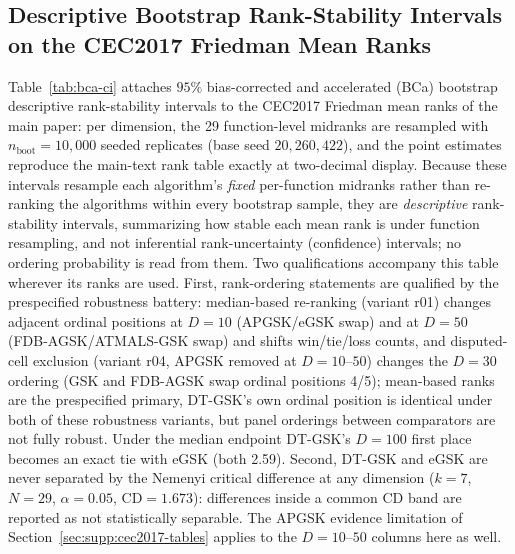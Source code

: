 \documentclass[algorithms,article,submit,moreauthors,pdftex]{Definitions/mdpi}
\newcommand{\dtgsk}{DT-GSK}
\newcommand{\atmals}{ATMALS-GSK}
\newcommand{\apgsk}{APGSK}
\newcommand{\fdbagsk}{FDB-AGSK}
\newcommand{\egsk}{eGSK}
\begin{document}
\subsection{Descriptive Bootstrap Rank-Stability Intervals on the CEC2017 Friedman Mean Ranks}\label{sec:supp:bca}

Table~\ref{tab:bca-ci} attaches $95\%$ bias-corrected and accelerated
(BCa) bootstrap descriptive rank-stability intervals to the
CEC2017 Friedman mean ranks of the main paper: per dimension, the 29
function-level midranks are resampled with $n_{\text{boot}} = 10{,}000$
seeded replicates (base seed $20{,}260{,}422$), and the point
estimates reproduce the main-text rank table exactly at two-decimal
display.
Because these intervals resample each algorithm's \emph{fixed} per-function
midranks rather than re-ranking the algorithms within every bootstrap
sample, they are \emph{descriptive} rank-stability intervals, summarizing
how stable each mean rank is under function resampling, and not
inferential rank-uncertainty (confidence) intervals; no ordering probability
is read from them.
Two qualifications accompany this table wherever its ranks are used.
First, rank-ordering statements are qualified by the prespecified
robustness battery: median-based re-ranking (variant r01) changes
adjacent ordinal positions at $D = 10$ (\apgsk{}/\egsk{} swap) and at
$D = 50$ (\fdbagsk{}/\atmals{} swap) and shifts win/tie/loss counts,
and disputed-cell exclusion (variant r04, \apgsk{} removed at
$D = 10$--$50$) changes the $D = 30$ ordering (GSK and \fdbagsk{} swap
ordinal positions 4/5); mean-based ranks are the prespecified
primary, \dtgsk{}'s own ordinal position is identical under both of these
robustness variants, but panel orderings between comparators are not fully robust.
Under the median endpoint \dtgsk{}'s $D = 100$ first place becomes an
exact tie with \egsk{} (both 2.59).
Second, \dtgsk{} and \egsk{} are never separated by the Nemenyi
critical difference at any dimension ($k = 7$, $N = 29$,
$\alpha = 0.05$, $\mathrm{CD} = 1.673$): differences inside a common CD
band are reported as not statistically
separable.
The \apgsk{} evidence limitation of Section~\ref{sec:supp:cec2017-tables}
applies to the $D = 10$--$50$ columns here as well.
\end{document}
